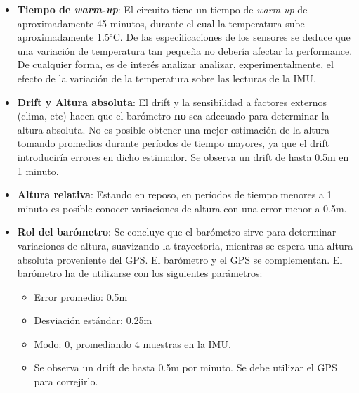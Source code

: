 \documentclass[spanish,12pt,a4paper,titlepage]{report}
\newcommand{\degc}{$^\circ$C}
\begin{document}
\begin{itemize}
\item \textbf{Tiempo de \textit{warm-up}}: El circuito tiene un tiempo de \textit{warm-up} de aproximadamente 45 minutos, durante el cual la temperatura sube aproximadamente 1.5\degc. De las especificaciones de los sensores se deduce que una variación de temperatura tan pequeña no debería afectar la performance. De cualquier forma, es de interés analizar analizar, experimentalmente, el efecto de la variación de la temperatura sobre las lecturas de la IMU.
\item \textbf{Drift y Altura absoluta}: El drift y la sensibilidad a factores externos (clima, etc) hacen que el barómetro \textbf{no} sea adecuado para determinar la altura absoluta. No es posible obtener una mejor estimación de la altura tomando promedios durante períodos de tiempo mayores, ya que el drift introduciría errores en dicho estimador. Se observa un drift de hasta 0.5m en 1 minuto.
\item \textbf{Altura relativa}: Estando en reposo, en períodos de tiempo menores a 1 minuto es posible conocer variaciones de altura con una error menor a 0.5m.
\item \textbf{Rol del barómetro}: Se concluye que el barómetro sirve para determinar variaciones de altura, suavizando la trayectoria, mientras se espera una altura absoluta proveniente del GPS. El barómetro y el GPS se complementan. El barómetro ha de utilizarse con los siguientes parámetros:
  \begin{itemize}
  \item Error promedio: 0.5m
  \item Desviación estándar: 0.25m
  \item Modo: 0, promediando 4 muestras en la IMU.
  \item Se observa un drift de hasta 0.5m por minuto. Se debe utilizar el GPS para correjirlo.
  \end{itemize}
\end{itemize}
\end{document}
